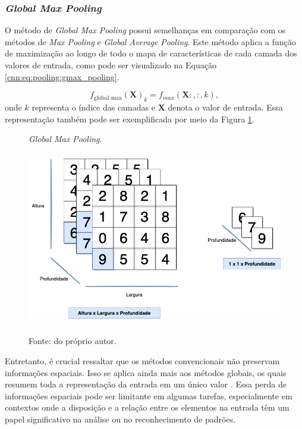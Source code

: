 \subsubsection{\textit{Global Max Pooling}}
\label{cnn:pooling:global_max_pooling}

O método de \textit{Global Max Pooling} possui semelhanças em comparação com os métodos de \textit{Max Pooling} e \textit{Global Average Pooling}. Este método aplica a função de maximização ao longo de todo o mapa de características de cada camada dos valores de entrada, como pode ser visualizado na Equação \ref{cnn:eq:pooling:gmax_pooling}.

\begin{equation}
    \label{cnn:eq:pooling:gmax_pooling}
    f_{\text{global max}}(\boldsymbol{X})_{k} = f_{max}(\boldsymbol{X}:,:,k),
\end{equation}
onde $k$ representa o índice das camadas e $\boldsymbol{X}$ denota o valor de entrada. Essa representação também pode ser exemplificada por meio da Figura \ref{cnn:fig:gmax_pooling}.

\begin{figure}[H]
    \centering
    \caption{\textit{Global Max Pooling}.}
    \includegraphics[height=3in]{recursos/imagens/deep/global_max_pooling.png}
    \label{cnn:fig:gmax_pooling}
    
    \caption*{Fonte: do próprio autor.}
\end{figure}

Entretanto, é crucial ressaltar que os métodos convencionais não preservam informações espaciais. Isso se aplica ainda mais aos métodos globais, os quais resumem toda a representação da entrada em um único valor \citep{Christlein2019DeepPooling}. Essa perda de informações espaciais pode ser limitante em algumas tarefas, especialmente em contextos onde a disposição e a relação entre os elementos na entrada têm um papel significativo na análise ou no reconhecimento de padrões.

